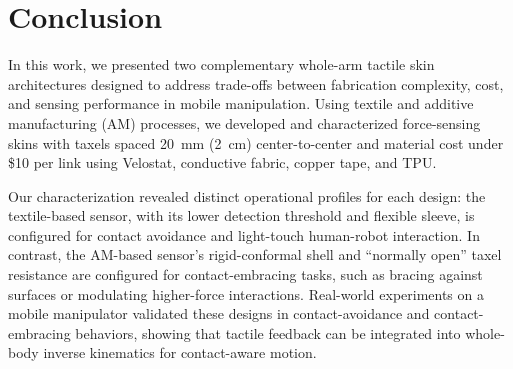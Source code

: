 \section{Conclusion}



In this work, we presented two complementary whole-arm tactile skin architectures designed to address trade-offs between fabrication complexity, cost, and sensing performance in mobile manipulation. Using textile and additive manufacturing (AM) processes, we developed and characterized force-sensing skins with taxels spaced 20~mm (2~cm) center-to-center and material cost under \$10 per link using Velostat, conductive fabric, copper tape, and TPU.

Our characterization revealed distinct operational profiles for each design: the textile-based sensor, with its lower detection threshold and flexible sleeve, is configured for contact avoidance and light-touch human-robot interaction. In contrast, the AM-based sensor's rigid-conformal shell and ``normally open'' taxel resistance are configured for contact-embracing tasks, such as bracing against surfaces or modulating higher-force interactions. Real-world experiments on a mobile manipulator validated these designs in contact-avoidance and contact-embracing behaviors, showing that tactile feedback can be integrated into whole-body inverse kinematics for contact-aware motion.

